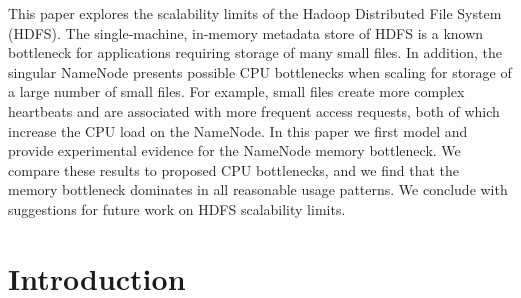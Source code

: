 \documentclass[11pt, a4paper]{article}
\author{\theauthor}
\title{\thetitle}
\date{\duedate}
\renewenvironment{abstract}
 {\small
  \begin{center}
  \bfseries \abstractname\vspace{-.5em}\vspace{0pt}
  \end{center}
  \list{}{%
    \setlength{\leftmargin}{0mm}%
    \setlength{\rightmargin}{\leftmargin}%
  }%
  \item\relax}
 {\endlist}
\begin{document}
\maketitle
\thispagestyle{empty}
\begin{multicols*}{2}
\begin{abstract}
    This paper explores the scalability limits of the Hadoop Distributed File System (HDFS). The single-machine, in-memory metadata store of HDFS is a known bottleneck for applications requiring storage of many small files. In addition, the singular NameNode presents possible CPU bottlenecks when scaling for storage of a large number of small files. For example, small files create more complex heartbeats and are associated with more frequent access requests, both of which increase the CPU load on the NameNode. In this paper we first model and provide experimental evidence for the NameNode memory bottleneck. We compare these results to proposed CPU bottlenecks, and we find that the memory bottleneck dominates in all reasonable usage patterns. We conclude with suggestions for future work on HDFS scalability limits.
\end{abstract}

\section{Introduction}




\end{multicols*}
\end{document}
